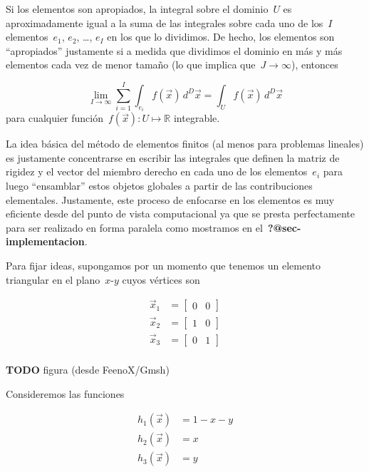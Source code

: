 \documentclass[
  12pt,
  a4paper,
  table]{scrbook}
\theoremstyle{plain}
\theoremstyle{definition}
\theoremstyle{plain}
\theoremstyle{plain}
\theoremstyle{remark}
\begin{document}
Si los elementos son apropiados, la integral sobre el dominio~\(U\) es
aproximadamente igual a la suma de las integrales sobre cada uno de
los~\(I\) elementos~\(e_1\), \(e_2\), \ldots, \(e_I\) en los que lo
dividimos. De hecho, los elementos son ``apropiados'' justamente si a
medida que dividimos el dominio en más y más elementos cada vez de menor
tamaño (lo que implica que~\(J \rightarrow \infty\)), entonces

\[
\lim_{I \rightarrow \infty} \sum_{i=1}^I \int_{e_i} f(\vec{x}) \, d^D\vec{x} = \int_{U} f(\vec{x}) \, d^D\vec{x}
\] para cualquier función~\(f(\vec{x}) : U \mapsto \mathbb{R}\)
integrable.

La idea básica del método de elementos finitos (al menos para problemas
lineales) es justamente concentrarse en escribir las integrales que
definen la matriz de rigidez y el vector del miembro derecho en cada uno
de los elementos~\(e_i\) para luego ``ensamblar'' estos objetos globales
a partir de las contribuciones elementales. Justamente, este proceso de
enfocarse en los elementos es muy eficiente desde del punto de vista
computacional ya que se presta perfectamente para ser realizado en forma
paralela como mostramos en el~\textbf{?@sec-implementacion}.

Para fijar ideas, supongamos por un momento que tenemos un elemento
triangular en el plano~\(x\)-\(y\) cuyos vértices son

\[
\begin{aligned}
\vec{x}_1 &= \begin{bmatrix}0 & 0\end{bmatrix} \\
\vec{x}_2 &= \begin{bmatrix}1 & 0\end{bmatrix} \\
\vec{x}_3 &= \begin{bmatrix}0 & 1\end{bmatrix} \\
\end{aligned}
\]

\textbf{TODO} figura (desde FeenoX/Gmsh)

Consideremos las funciones

\[
\begin{aligned}
h_1(\vec{x}) &= 1 - x - y \\
h_2(\vec{x}) &= x \\
h_3(\vec{x}) &= y \\
\end{aligned}
\]
\end{document}
